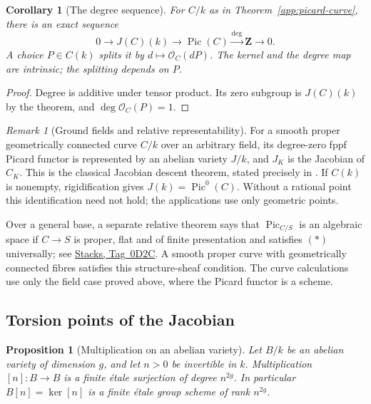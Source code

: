 \documentclass[11pt,a4paper]{article}
\numberwithin{equation}{section}
\newtheorem{proposition}[theorem]{Proposition}
\newtheorem{corollary}[theorem]{Corollary}
\theoremstyle{definition}
\theoremstyle{remark}
\newtheorem{remark}[theorem]{Remark}
\newcommand{\stacks}[1]{\href{https://stacks.math.columbia.edu/tag/#1}{\textnormal{Stacks, Tag~#1}}}
\begin{document}
\begin{corollary}[The degree sequence]
\label{app:picard-degree}
For $C/k$ as in Theorem~\ref{app:picard-curve}, there is an exact
sequence
\[
 0\longrightarrow J(C)(k)
   \longrightarrow\operatorname{Pic}(C)
   \xrightarrow{\deg}\mathbf Z\longrightarrow0.
\]
A choice $P\in C(k)$ splits it by
$d\mapsto\mathcal O_C(dP)$. The kernel and the degree map are
intrinsic; the splitting depends on $P$.
\end{corollary}

\begin{proof}
Degree is additive under tensor product. Its zero subgroup is
$J(C)(k)$ by the theorem, and $\deg\mathcal O_C(P)=1$.
\end{proof}

\begin{remark}[Ground fields and relative representability]
\label{app:picard-relative-scope}
For a smooth proper geometrically connected curve $C/k$ over an
arbitrary field, its degree-zero fppf Picard functor is represented
by an abelian variety $J/k$, and $J_K$ is the Jacobian of $C_K$.
This is the classical Jacobian descent theorem, stated precisely
in \cite[Theorem~1.1 and Proposition~1.9]{MilneJV}. If $C(k)$ is
nonempty, rigidification gives $J(k)=\operatorname{Pic}^0(C)$.
Without a rational point this identification need not hold; the
applications use only geometric points.

Over a general base, a separate relative theorem says that
$\operatorname{Pic}_{C/S}$ is an algebraic space if $C\to S$ is
proper, flat and of finite presentation and satisfies $(\ast)$
universally; see \stacks{0D2C}. A smooth proper curve with geometrically
connected fibres satisfies this structure-sheaf condition. The curve
calculations use only the field case proved above, where the Picard
functor is a scheme.
\end{remark}

\subsection{Torsion points of the Jacobian}
\label{app:jacobian-multiplication}

\begin{proposition}[Multiplication on an abelian variety]
\label{app:abelian-multiplication}
Let $B/k$ be an abelian variety of dimension $g$, and let $n>0$ be
invertible in $k$. Multiplication $[n]:B\to B$ is a finite \'etale
surjection of degree $n^{2g}$. In particular $B[n]=\ker[n]$ is a
finite \'etale group scheme of rank $n^{2g}$.
\end{proposition}
\end{document}
